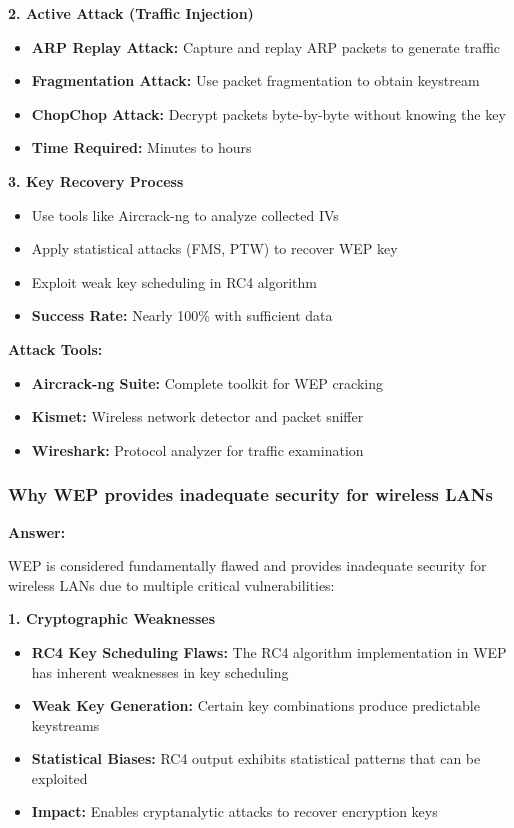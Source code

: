 \documentclass[12pt,a4paper]{article}
\begin{document}
\textbf{2. Active Attack (Traffic Injection)}
\begin{itemize}
    \item \textbf{ARP Replay Attack:} Capture and replay ARP packets to generate traffic
    \item \textbf{Fragmentation Attack:} Use packet fragmentation to obtain keystream
    \item \textbf{ChopChop Attack:} Decrypt packets byte-by-byte without knowing the key
    \item \textbf{Time Required:} Minutes to hours
\end{itemize}

\textbf{3. Key Recovery Process}
\begin{itemize}
    \item Use tools like Aircrack-ng to analyze collected IVs
    \item Apply statistical attacks (FMS, PTW) to recover WEP key
    \item Exploit weak key scheduling in RC4 algorithm
    \item \textbf{Success Rate:} Nearly 100\% with sufficient data
\end{itemize}

\textbf{Attack Tools:}
\begin{itemize}
    \item \textbf{Aircrack-ng Suite:} Complete toolkit for WEP cracking
    \item \textbf{Kismet:} Wireless network detector and packet sniffer
    \item \textbf{Wireshark:} Protocol analyzer for traffic examination
\end{itemize}

\subsubsection{Why WEP provides inadequate security for wireless LANs}

\textbf{Answer:}

WEP is considered fundamentally flawed and provides inadequate security for wireless LANs due to multiple critical vulnerabilities:

\textbf{1. Cryptographic Weaknesses}
\begin{itemize}
    \item \textbf{RC4 Key Scheduling Flaws:} The RC4 algorithm implementation in WEP has inherent weaknesses in key scheduling
    \item \textbf{Weak Key Generation:} Certain key combinations produce predictable keystreams
    \item \textbf{Statistical Biases:} RC4 output exhibits statistical patterns that can be exploited
    \item \textbf{Impact:} Enables cryptanalytic attacks to recover encryption keys
\end{itemize}
\end{document}
